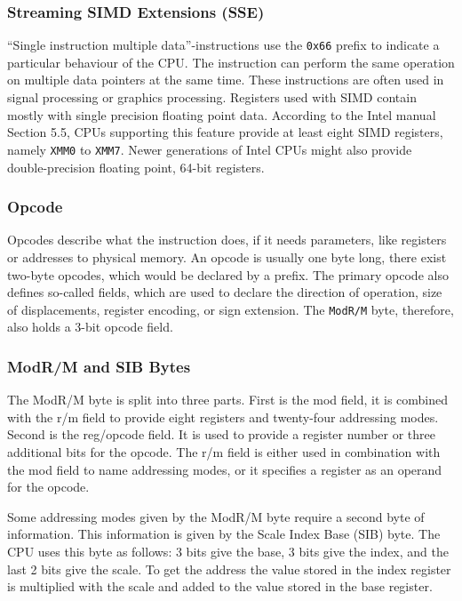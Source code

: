 \subsubsection{Streaming SIMD Extensions (SSE)}

``Single instruction multiple data''-instructions use the \texttt{0x66} prefix
to indicate a particular behaviour of the CPU. The instruction can perform the
same operation on multiple data pointers at the same time. These instructions
are often used in signal processing or graphics processing. Registers used with
SIMD contain mostly with single precision floating point data. According to the
Intel manual~\cite{intelsys} Section 5.5, CPUs supporting this feature provide
at least eight SIMD registers, namely \texttt{XMM0} to \texttt{XMM7}. Newer
generations of Intel CPUs might also provide double-precision floating point,
64-bit registers.

\subsubsection{Opcode}

Opcodes describe what the instruction does, if it needs parameters, like
registers or addresses to physical memory. An opcode is usually one byte long,
there exist two-byte opcodes, which would be declared by a prefix. The primary
opcode also defines so-called fields, which are used to declare the direction of
operation, size of displacements, register encoding, or sign extension. The
\texttt{ModR/M} byte, therefore, also holds a 3-bit opcode field.

\subsubsection{ModR/M and SIB Bytes}

The ModR/M byte is split into three parts. First is the mod field, it is
combined with the r/m field to provide eight registers and twenty-four
addressing modes. Second is the reg/opcode field. It is used to provide a
register number or three additional bits for the opcode. The r/m field is either
used in combination with the mod field to name addressing modes, or it specifies
a register as an operand for the opcode.

Some addressing modes given by the ModR/M byte require a second byte of
information. This information is given by the Scale Index Base (SIB) byte. The
CPU uses this byte as follows: 3 bits give the base, 3 bits give the index, and
the last 2 bits give the scale. To get the address the value stored in the index
register is multiplied with the scale and added to the value stored in the base
register.

